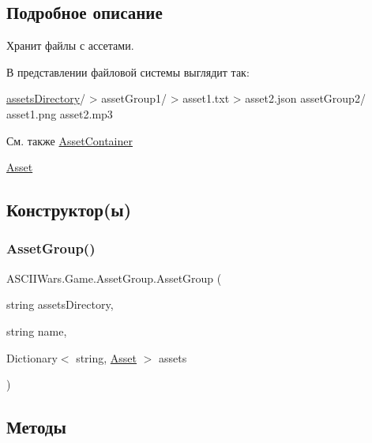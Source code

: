\subsection{Подробное описание}
Хранит файлы с ассетами. 

В представлении файловой системы выглядит так\+: 
\begin{DoxyCode}
\hyperlink{class_a_s_c_i_i_wars_1_1_game_1_1_asset_group_a6c7083ec7602a32f4e99601ef5d54397}{assetsDirectory}/
>     assetGroup1/
>         asset1.txt
>         asset2.json
    assetGroup2/
        asset1.png
        asset2.mp3
\end{DoxyCode}


\begin{DoxySeeAlso}{См. также}
\hyperlink{class_a_s_c_i_i_wars_1_1_game_1_1_asset_container}{Asset\+Container} 

\hyperlink{class_a_s_c_i_i_wars_1_1_game_1_1_asset}{Asset} 
\end{DoxySeeAlso}


\subsection{Конструктор(ы)}
\hypertarget{class_a_s_c_i_i_wars_1_1_game_1_1_asset_group_a0477f5fe9d3a2828e2ef4c2ddb7aa565}{}\label{class_a_s_c_i_i_wars_1_1_game_1_1_asset_group_a0477f5fe9d3a2828e2ef4c2ddb7aa565} 
\subsubsection{\texorpdfstring{Asset\+Group()}{AssetGroup()}}
{\footnotesize\ttfamily A\+S\+C\+I\+I\+Wars.\+Game.\+Asset\+Group.\+Asset\+Group (\begin{DoxyParamCaption}\item[{string}]{assets\+Directory,  }\item[{string}]{name,  }\item[{Dictionary$<$ string, \hyperlink{class_a_s_c_i_i_wars_1_1_game_1_1_asset}{Asset} $>$}]{assets }\end{DoxyParamCaption})\hspace{0.3cm}{\ttfamily [inline]}}



\subsection{Методы}
\hypertarget{class_a_s_c_i_i_wars_1_1_game_1_1_asset_group_a16cbe328487eba763e92bb4551a67311}{}\label{class_a_s_c_i_i_wars_1_1_game_1_1_asset_group_a16cbe328487eba763e92bb4551a67311} 
